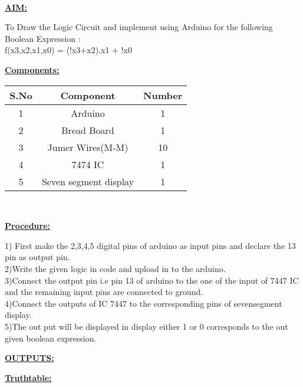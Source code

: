 \documentclass[10pt,a4paper]{report}
\begin{document}
\\ \raggedright \textbf{\underline{AIM:}}\vspace{2mm}
\\ \raggedright To Draw the Logic Circuit and implement using Arduino for the following Boolean Expression :
\\ f(x3,x2,x1,x0) = (!x3+x2).x1 + !x0
\vspace{5mm}
\\ \raggedright \textbf{\underline{Components:}}\vspace{2mm}
\begin{table}[ht]
\centering %
\begin{tabular}{c c c} %
\hline\hline %
S.No & Component & Number \\ [0.5ex] %
\hline
1 & Arduino & 1 \\
2 & Bread Board & 1 \\
3 & Jumer Wires(M-M) & 10 \\
4 & 7474 IC & 1 \\
5 & Seven segment display & 1 \\ [1ex] 
\hline
\end{tabular}
\end{table}
\vspace{5mm}
\\ \raggedright \textbf{\underline{Procedure:}}\vspace{2mm}
\\ \raggedright 1) First make the 2,3,4,5 digital pins of arduino as input pins and declare the 13 pin as output pin.
\\ 2)Write the given logic in code and upload in to the arduino.
\\ 3)Connect the output pin i.e pin 13 of arduino to the one of the input of 7447 IC and the remaining input pins are connected to ground.
\\ 4)Connect the outputs of IC 7447 to the corresponding pins of sevensegment display.
\\ 5)The out put will be displayed in display either 1 or 0 corresponds to the out given boolean expression.
\vspace{5mm}
\\ \raggedright \textbf{\underline{OUTPUTS:}}\vspace{7mm}
\\ \raggedright \textbf{\underline{Truthtable:}}\vspace{2mm}
\end{document}
